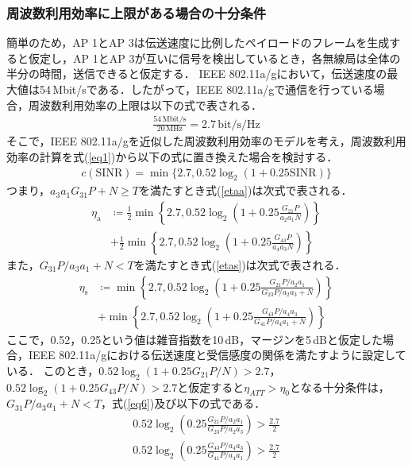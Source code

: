 \documentclass[master]{kuisthesis}		%
\begin{document}
\subsubsection{周波数利用効率に上限がある場合の十分条件}
簡単のため，AP 1とAP 3は伝送速度に比例したペイロードのフレームを生成すると仮定し，AP 1とAP 3が互いに信号を検出しているとき，各無線局は全体の半分の時間，送信できると仮定する．
IEEE 802.11a/gにおいて，伝送速度の最大値は54\,Mbit/sである\cite{11}．したがって，IEEE 802.11a/gで通信を行っている場合，周波数利用効率の上限は以下の式で表される．
\begin{align}
\frac{54\,\mathrm{Mbit/s}}{20\,\mathrm{MHz}}=2.7\,\mathrm{bit/s/Hz}
\end{align}
そこで，IEEE 802.11a/gを近似した周波数利用効率のモデルを考え，周波数利用効率の計算を式(\ref{eq1})から以下の式に置き換えた場合を検討する．
\begin{align}\label{SINRdash}
c(\mathrm{SINR}) = \min \{2.7,0.52\log _2  (1+0.25\mathrm{SINR})\}
\end{align}
つまり，$a_3a_1G_{31}P + N \geq T$を満たすとき式(\ref{etaa})は次式で表される．
\begin{align}
\label{etaadash1}
\nonumber \eta_\mathrm{a} &\coloneqq
\frac{1}{2}\min\left\{2.7,0.52\log_2 \left(1+ 0.25\frac{G_{21}P}{a_2a_1N}\right)\right\} \\
&+ \frac{1}{2}\min\left\{2.7,0.52\log_2 \left(1+ 0.25\frac{G_{43}P}{a_4a_3N}\right)\right\}
\end{align}
また，$G_{31}P/a_3a_1 + N < T$を満たすとき式(\ref{etas})は次式で表される．
\begin{align}
\label{etasdash1}
\nonumber \eta_\mathrm{s} &\coloneqq \min\left\{2.7,0.52\log_2 \left(1+ 0.25\frac{G_{21}P/a_2a_1}{G_{23}P/a_2a_3 + N}\right)\right\}\\
 &+ \min\left\{2.7,0.52\log_2 \left(1+ 0.25\frac{G_{43}P/a_4a_3}{G_{41}P/a_4a_1 + N}\right)\right\}
\end{align}
ここで，0.52，0.25という値は雑音指数を10\,dB，マージンを5\,dBと仮定した場合，IEEE 802.11a/gにおける伝送速度と受信感度の関係を満たすように設定している．
このとき，$0.52\log_2(1 + 0.25 G_{21}P/N) > 2.7$，$0.52\log_2(1 + 0.25 G_{43}P/N) > 2.7$と仮定すると$\eta_{ATT} > \eta_0$となる十分条件は，$G_{31}P/a_3a_1+N<T$，式(\ref{eq6})及び以下の式である．
\begin{align}
0.52\log_2\left(0.25\frac{G_{21} P/a_2 a_1 }{G_{23} P/a_2 a_3 }\right) > \frac{2.7}{2} \nonumber \\0.52\log_2\left(0.25\frac{G_{43} P/a_4 a_3 }{G_{41} P/a_4 a_1 }\right) > \frac{2.7}{2} \label{eq100}
\end{align}
\end{document}
